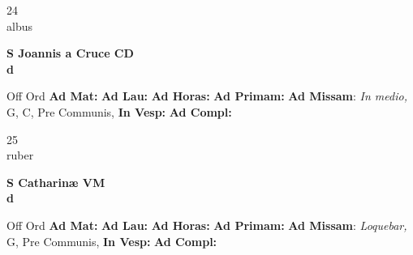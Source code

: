 \documentclass[10pt, openany]{book}
\begin{document}
    \begin{center}
        \begin{minipage}{3.5in}
            \vspace{2em}
            \begin{minipage}{0.5in}
                {\Huge 24} \\
                {\normalsize albus}
            \end{minipage}
            \begin{minipage}{3.0in}
                \textbf{ \large S Joannis a Cruce CD \\
                \textnormal{\normalsize d}}

            \end{minipage}
            \begin{justify}Off Ord
                \textbf{Ad Mat: }
                \textbf{Ad Lau: }
                \textbf{Ad Horas: }
                \textbf{Ad Primam: }\textbf{Ad Missam}: \textit{In medio,} G, C, Pre Communis, 
                \textbf{In Vesp: }
                \textbf{Ad Compl: }
            \end{justify}
        \end{minipage}
    \end{center}

    \begin{center}
        \begin{minipage}{3.5in}
            \vspace{2em}
            \begin{minipage}{0.5in}
                {\Huge 25} \\
                {\normalsize ruber}
            \end{minipage}
            \begin{minipage}{3.0in}
                \textbf{ \large S Catharinæ VM \\
                \textnormal{\normalsize d}}

            \end{minipage}
            \begin{justify}Off Ord
                \textbf{Ad Mat: }
                \textbf{Ad Lau: }
                \textbf{Ad Horas: }
                \textbf{Ad Primam: }\textbf{Ad Missam}: \textit{Loquebar,} G, Pre Communis, 
                \textbf{In Vesp: }
                \textbf{Ad Compl: }
            \end{justify}
        \end{minipage}
    \end{center}
\end{document}
